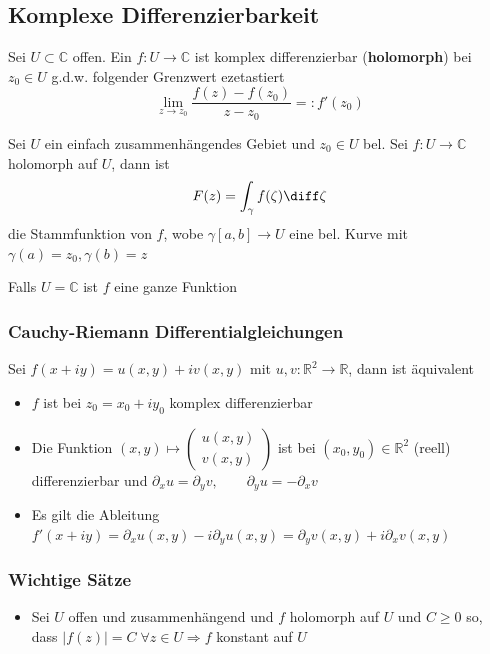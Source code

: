 \subsection{Komplexe Differenzierbarkeit}
\begin{emphbox}
    Sei $U\subset\mathbb C$ offen. Ein $f:U\rightarrow\mathbb C$ ist komplex differenzierbar (\textbf{holomorph}) bei $z_0\in U$ g.d.w. folgender Grenzwert ezetastiert
    \begin{equation*}
        \lim_{z\rightarrow z_0}\frac{f(z) - f(z_0)}{z-z_0}=:f'(z_0)
    \end{equation*}

    Sei $U$ ein einfach zusammenhängendes Gebiet und $z_0\in U$ bel. Sei $f:U\rightarrow\mathbb C$ holomorph auf $U$, dann ist
    \begin{equation*}
        F(z) = \int_\gamma f(\zeta)\diff\zeta
    \end{equation*}
    die Stammfunktion von $f$, wobe $\gamma[a,b]\rightarrow U$ eine bel. Kurve mit $\gamma(a) = z_0, \gamma(b) = z$
\end{emphbox}
Falls $U=\mathbb C$ ist $f$ eine ganze Funktion

\begin{sectionbox}
    \subsubsection{Cauchy-Riemann Differentialgleichungen}
    Sei $f(x+iy) = u(x,y) + iv(x,y)$ mit $u,v:\mathbb R^2 \rightarrow \mathbb R$, dann ist äquivalent
    \begin{itemize}
        \item $f$ ist bei $z_0 = x_0+iy_0$ komplex differenzierbar
        \item Die Funktion $(x,y)\mapsto \begin{pmatrix}u(x,y) \\ v(x,y)\end{pmatrix}$ ist bei $(x_0,y_0)\in\mathbb R^2$ (reell) differenzierbar und $\partial_x u = \partial_y v, \qquad \partial_y u = -\partial_x v$
        \item Es gilt die Ableitung $f'(x+iy) = \partial_x u(x,y) - i\partial_y u(x,y)=\partial_y v(x,y) + i\partial_x v(x,y)$
    \end{itemize}
\end{sectionbox}
\begin{sectionbox}
    \subsubsection{Wichtige Sätze}
    \begin{itemize}
        \item Sei $U$ offen und zusammenhängend und $f$ holomorph auf $U$ und $C\ge 0$ so, dass $|f(z)|=C \; \forall z\in U \Rightarrow f$ konstant auf $U$
    \end{itemize}
\end{sectionbox}

